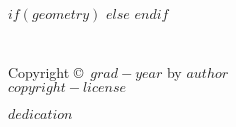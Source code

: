 \documentclass[12pt,oneside,letterpaper]{memoir}
\def\copyrightpage{
  \chapter*{}            %
  \begin{center}
   \vfill
   \begin{normalsize}
    Copyright \copyright\ $grad-year$ by $author$ \\ 
    $copyright-license$
   \end{normalsize}
   \thispagestyle{empty}    %
  \end{center}
  \par\clearpage}
\begin{document}
\maketitle
\thispagestyle{empty}
\cleardoublepage

$if(geometry)$
$else$
  \restoregeometry
$endif$

\copyrightpage





\restorepagenumber

\begin{dedication}
 $dedication$
\end{dedication}







\renewcommand{\printtoctitle}[1]{\chapter*{#1}}
\renewcommand{\printloftitle}[1]{\chapter*{#1}}
\renewcommand{\printlottitle}[1]{\chapter*{#1}}

\renewcommand\cftchapterfont{\normalfont}
\renewcommand\cftchapterpagefont{\normalfont}




\end{document}
